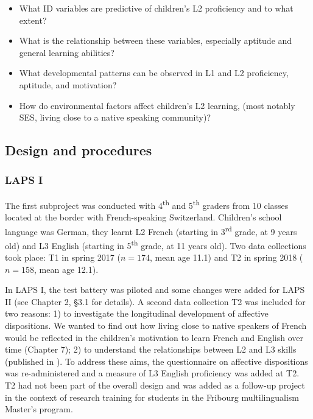 \documentclass[output=paper]{langsci/langscibook}
\begin{document}
\begin{itemize}
\item What ID variables are predictive of children’s L2 proficiency and to what extent?
\item What is the relationship between these variables, especially aptitude and general learning abilities?
\item What developmental patterns can be observed in L1 and L2 proficiency, aptitude, and motivation?
\item How do environmental factors affect children’s L2 learning, (most notably SES, living close to a native speaking community)?
\end{itemize}


\subsection{Design and procedures}
\subsubsection{LAPS I}

The first subproject was conducted with 4\textsuperscript{th} and 5\textsuperscript{th} graders from 10 classes located at the border with French-speaking Switzerland. Children’s school language was German, they learnt L2 French (starting in 3\textsuperscript{rd} grade, at 9 years old) and L3 English (starting in 5\textsuperscript{th} grade, at 11 years old). Two data collections took place: T1 in spring 2017 ($n=174$, mean age 11.1) and T2 in spring 2018 ($n=158$, mean age 12.1).

In LAPS I, the test battery was piloted and some changes were added for LAPS II (see Chapter 2, §3.1 for details). A second data collection T2 was included for two reasons: 1) to investigate the longitudinal development of affective dispositions. We wanted to find out how living close to native speakers of French would be reflected in the children’s motivation to learn French and English over time (Chapter 7); 2) to understand the relationships between L2 and L3 skills (published in \citealt{BertheleUdry2019}). To address these aims, the questionnaire on affective dispositions was re-administered and a measure of L3 English proficiency was added at T2. T2 had not been part of the overall design and was added as a follow-up project in the context of research training for students in the Fribourg multilingualism Master’s program.
\end{document}
